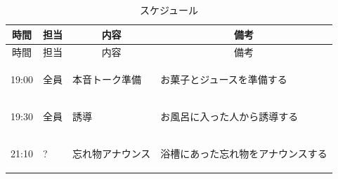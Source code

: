 \begin{longtable}[c]{|p{}|p{}|p{}|p{}|}
  \caption{スケジュール} \\
  \hline
  \multicolumn{1}{|c|}{時間} & \multicolumn{1}{c|}{担当} & \multicolumn{1}{c|}{内容} & \multicolumn{1}{c|}{備考} \\
  \hline
  \endfirsthead
  
  \hline
  \multicolumn{1}{|c|}{時間} & \multicolumn{1}{c|}{担当} & \multicolumn{1}{c|}{内容} & \multicolumn{1}{c|}{備考} \\
  \hline
  \endhead
  
  \hline
  \endfoot
  
  \hline
  \endlastfoot
  
  \begin{tpacol}
    19:00
  \end{tpacol}&
  \begin{tpbcol}
    全員
  \end{tpbcol}&
  \begin{tpccol}
    本音トーク準備
  \end{tpccol}&
  \begin{tpdcol}
    お菓子とジュースを準備する \par
  \end{tpdcol}\\

  \begin{tpacol}
    19:30
  \end{tpacol}&
  \begin{tpbcol}
    全員
  \end{tpbcol}&
  \begin{tpccol}
    誘導
  \end{tpccol}&
  \begin{tpdcol}
    お風呂に入った人から誘導する
  \end{tpdcol}\\

  \begin{tpacol}
    21:10
  \end{tpacol}&
  \begin{tpbcol}
    ?
  \end{tpbcol}&
  \begin{tpccol}
    忘れ物アナウンス
  \end{tpccol}&
  \begin{tpdcol}
    浴槽にあった忘れ物をアナウンスする
  \end{tpdcol}\\


\end{longtable}
